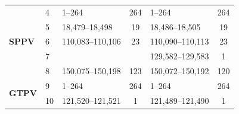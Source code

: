 \begin{table}[ht]
\begin{tabular}{l|llc|lc}
	\multirow{5}{*}{\textbf{SPPV}}          & 4            & 1--264                                                                                      & 264                                                                   & 1--264                                                                                     & 264                                                                   \\
											& 5            & 18,479--18,498                                                                              & 19                                                                    & 18,486--18,505                                                                             & 19                                                                    \\
											& 6            & 110,083--110,106                                                                            & 23                                                                    & 110,090--110,113                                                                           & 23                                                                    \\
											& 7            &                                                                                             &                                                                       & 129,582--129,583                                                                           & 1                                                                     \\
											& 8            & 150,075--150,198                                                                            & 123                                                                   & 150,072--150,192                                                                           & 120                                                                   \\ \hline
	\multirow{3}{*}{\textbf{GTPV}}          & 9            & 1--264                                                                                      & 264                                                                   & 1--264                                                                                     & 264                                                                   \\
											& 10           & 121,520--121,521                                                                            & 1                                                                     & 121,489--121,490                                                                           & 1                                                                     \\

\end{tabular}
\end{table}
